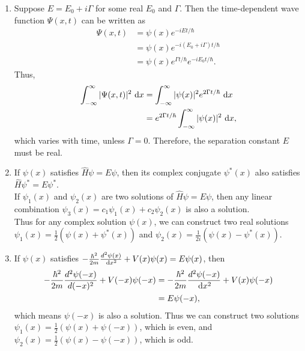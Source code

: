 \documentclass[en, oneside]{vivi}
\begin{document}
\begin{sol}
    \begin{enumerate}[label=(\alph*)]
        \item Suppose $E = E_0 + i\Gamma$ for some real $E_0$ and $\Gamma$. Then the time-dependent wave function $\Psi(x, t)$ can be written as
        \begin{align*}
            \Psi(x, t) &= \psi(x)e^{-iEt/\hbar}\\
            &= \psi(x)e^{-i(E_0 + i\Gamma)t/\hbar}\\
            &= \psi(x)e^{\Gamma t/\hbar}e^{-iE_0t/\hbar}.
        \end{align*}
        Thus,
        \begin{align*}
            \int_{-\infty}^{\infty}|\Psi(x, t)|^2 \dif x &= \int_{-\infty}^{\infty}|\psi(x)|^2e^{2\Gamma t/\hbar} \dif x\\
            &= e^{2\Gamma t/\hbar}\int_{-\infty}^{\infty}|\psi(x)|^2 \dif x,
        \end{align*}
        which varies with time, unless $\Gamma = 0$. Therefore, the separation constant $E$ must be real.
        \item If $\psi(x)$ satisfies $\hat H \psi = E\psi$, then its complex conjugate $\psi^*(x)$ also satisfies $\hat H \psi^* = E\psi^*$.\\
        If $\psi_1(x)$ and $\psi_2(x)$ are two solutions of $\hat H \psi = E\psi$, then any linear combination $\psi_3(x) = c_1\psi_1(x) + c_2\psi_2(x)$ is also a solution.\\
        Thus for any complex solution $\psi(x)$, we can construct two real solutions $\psi_1(x) = \frac{1}{2}(\psi(x) + \psi^*(x))$ and $\psi_2(x) = \frac{1}{2i}(\psi(x) - \psi^*(x))$.
        \item If $\psi(x)$ satisfies $ -\frac{\hbar^2}{2m}\frac{d^2\psi(x)}{ \dif x^2} + V(x)\psi(x) = E\psi(x)$, then
        \begin{align*}
            -\frac{\hbar^2}{2m}\frac{d^2\psi(-x)}{d(-x)^2} + V(-x)\psi(-x) &= -\frac{\hbar^2}{2m}\frac{d^2\psi(-x)}{ \dif x^2} + V(x)\psi(-x)\\
            &= E\psi(-x),
        \end{align*}
        which means $\psi(-x)$ is also a solution. 
        Thus we can construct two solutions $\psi_1(x) = \frac{1}{2}(\psi(x) + \psi(-x))$, which is even, and $\psi_2(x) = \frac{1}{2}(\psi(x) - \psi(-x))$, which is odd.
    \end{enumerate}
\end{sol}
\end{document}
